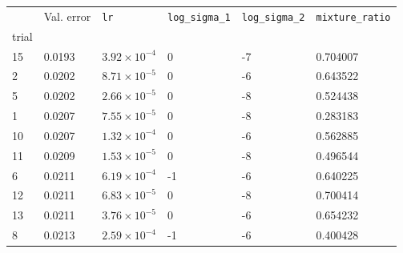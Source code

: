 \begin{tabular}{lp{2.3cm}p{2.3cm}p{2.3cm}p{2.3cm}p{2.3cm}}
\toprule
{} &  Val. error &         \texttt{lr} &  \texttt{log\_sigma\_1} &  \texttt{log\_sigma\_2} &  \texttt{mixture\_ratio} \\
trial &             &                     &                         &                         &                          \\
\midrule
15    &      0.0193 & $3.92\times10^{-4}$ &                       0 &                      -7 &                 0.704007 \\
2     &      0.0202 & $8.71\times10^{-5}$ &                       0 &                      -6 &                 0.643522 \\
5     &      0.0202 & $2.66\times10^{-5}$ &                       0 &                      -8 &                 0.524438 \\
1     &      0.0207 & $7.55\times10^{-5}$ &                       0 &                      -8 &                 0.283183 \\
10    &      0.0207 & $1.32\times10^{-4}$ &                       0 &                      -6 &                 0.562885 \\
11    &      0.0209 & $1.53\times10^{-5}$ &                       0 &                      -8 &                 0.496544 \\
6     &      0.0211 & $6.19\times10^{-4}$ &                      -1 &                      -6 &                 0.640225 \\
12    &      0.0211 & $6.83\times10^{-5}$ &                       0 &                      -8 &                 0.700414 \\
13    &      0.0211 & $3.76\times10^{-5}$ &                       0 &                      -6 &                 0.654232 \\
8     &      0.0213 & $2.59\times10^{-4}$ &                      -1 &                      -6 &                 0.400428 \\
\bottomrule
\end{tabular}

